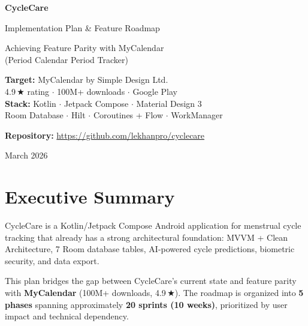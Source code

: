 \documentclass[12pt,a4paper]{article}
\begin{document}
\begin{titlepage}
\centering
\vspace*{2cm}
{\Huge\bfseries\textcolor{primary}{CycleCare}\par}
\vspace{0.5cm}
{\LARGE Implementation Plan \& Feature Roadmap\par}
\vspace{1cm}
{\large Achieving Feature Parity with MyCalendar\\(Period Calendar Period Tracker)\par}
\vspace{2cm}

\begin{tcolorbox}[colback=primary!5, colframe=primary, width=0.85\textwidth, arc=4mm]
\centering
\textbf{Target:} MyCalendar by Simple Design Ltd.\\
4.9\,\(\bigstar\) rating \(\cdot\) 100M+ downloads \(\cdot\) Google Play\\[6pt]
\textbf{Stack:} Kotlin \(\cdot\) Jetpack Compose \(\cdot\) Material Design 3\\
Room Database \(\cdot\) Hilt \(\cdot\) Coroutines + Flow \(\cdot\) WorkManager
\end{tcolorbox}

\vfill
{\large\textbf{Repository:} \url{https://github.com/lekhanpro/cyclecare}\par}
\vspace{0.5cm}
{\large March 2026\par}
\end{titlepage}

\tableofcontents
\newpage

\section{Executive Summary}

CycleCare is a Kotlin/Jetpack Compose Android application for menstrual cycle tracking that already has a strong architectural foundation: MVVM + Clean Architecture, 7 Room database tables, AI-powered cycle predictions, biometric security, and data export.

This plan bridges the gap between CycleCare's current state and feature parity with \textbf{MyCalendar} (100M+ downloads, 4.9\,\(\bigstar\)). The roadmap is organized into \textbf{5 phases} spanning approximately \textbf{20 sprints (10 weeks)}, prioritized by user impact and technical dependency.
\end{document}
